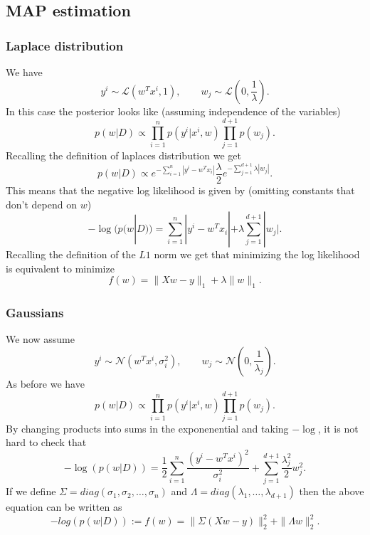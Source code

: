 \documentclass[11pt]{article}
\theoremstyle{plain}
\begin{document}
\subsection{MAP estimation}
\subsubsection{Laplace distribution}
We have
\begin{equation*}
y^{i}\sim\mathcal{L}(w^{T}x^{i},1),\qquad w_{j}\sim\mathcal{L}(0,\frac{1}{\lambda}).
\end{equation*}
In this case the posterior looks like (assuming independence of the variables)
\begin{equation*}
p(w|D)\propto\prod_{i=1}^{n}p(y^{i}|x^{i},w)\prod_{j=1}^{d+1}p(w_{j}).
\end{equation*}
Recalling the definition of laplaces distribution we get
\begin{equation*}
p(w|D)\propto e^{-\sum_{i=1}^{n}|y^{i}-w^{T}x_{i}|}\frac{\lambda}{2}e^{-\sum_{j=1}^{d+1}\lambda|w_{j}|}.
\end{equation*}
This means that the negative log likelihood is given by (omitting constants that don't depend on $w$)
\begin{equation*}
-\log(p(w|D))=\sum_{i=1}^{n}|y^{i}-w^{T}x_{i}|+\lambda\sum_{j=1}^{d+1} |w_{j}|.
\end{equation*}
Recalling the definition of the $L1$ norm we get that minimizing the log likelihood
is equivalent to minimize
\begin{equation*}
f(w)=\|Xw-y\|_{1}+\lambda\|w\|_{1}.
\end{equation*}


\subsubsection{Gaussians}
We now assume
\begin{equation*}
y^{i}\sim\mathcal{N}(w^{T}x^{i},\sigma_{i}^{2}),\qquad w_{j}\sim\mathcal{N}(0,\frac{1}{\lambda_{j}}).
\end{equation*}
As before we have
\begin{equation*}
p(w|D)\propto\prod_{i=1}^{n}p(y^{i}|x^{i},w)\prod_{j=1}^{d+1}p(w_{j}).
\end{equation*}
By changing products into sums in the exponenential and taking $-\log$, it is not hard
to check that 
\begin{equation*}
-\log(p(w|D))=\frac{1}{2}\sum_{i=1}^{n}\frac{(y^{i}-w^{T}x^{i})^{2}}{\sigma_{i}^{2}}+
\sum_{j=1}^{d+1}\frac{\lambda_{j}^{2}}{2}w_{j}^{2}.
\end{equation*}
If we define $\Sigma=diag(\sigma_{1},\sigma_{2},\ldots,\sigma_{n})$ and
$\Lambda=diag(\lambda_{1},\ldots,\lambda_{d+1})$ then the above equation can be written as
\begin{equation*}
-log(p(w|D)):=f(w)=\|\Sigma(Xw-y)\|_{2}^{2}+\|\Lambda w\|_{2}^{2}.
\end{equation*}
\end{document}
